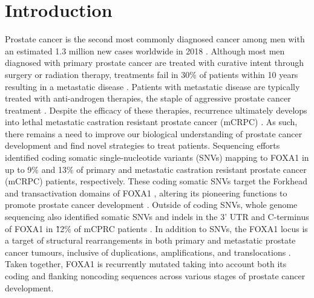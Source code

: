 \section{Introduction}

Prostate cancer is the second most commonly diagnosed cancer among men with an estimated 1.3 million new cases worldwide in 2018 \cite{brayGlobalCancerStatistics2018}.
Although most men diagnosed with primary prostate cancer are treated with curative intent through surgery or radiation therapy, treatments fail in 30\% of patients within 10 years \cite{boorjianLongTermOutcomeRadical2007} resulting in a metastatic disease \cite{litwinDiagnosisTreatmentProstate2017}.
Patients with metastatic disease are typically treated with anti-androgen therapies, the staple of aggressive prostate cancer treatment \cite{attardProstateCancer2016}.
Despite the efficacy of these therapies, recurrence ultimately develops into lethal metastatic castration resistant prostate cancer (mCRPC) \cite{attardProstateCancer2016}.
As such, there remains a need to improve our biological understanding of prostate cancer development and find novel strategies to treat patients.
Sequencing efforts identified coding somatic single-nucleotide variants (SNVs) mapping to FOXA1 in up to 9\% \cite{abeshouseMolecularTaxonomyPrimary2015,fraserGenomicHallmarksLocalized2017,barbieriExomeSequencingIdentifies2012, grassoMutationalLandscapeLethal2012,paroliaDistinctStructuralClasses2019,adamsFOXA1MutationsAlter2019} and 13\% \cite{paroliaDistinctStructuralClasses2019,adamsFOXA1MutationsAlter2019,robinsonIntegrativeClinicalGenomics2015} of primary and metastatic castration resistant prostate cancer (mCRPC) patients, respectively.
These coding somatic SNVs target the Forkhead and transactivation domains of FOXA1 \cite{robinsonFOXA1MutationsHormonedependent2013}, altering its pioneering functions to promote prostate cancer development \cite{adamsFOXA1MutationsAlter2019,gaoForkheadDomainMutations2019}.
Outside of coding SNVs, whole genome sequencing also identified somatic SNVs and indels in the 3' UTR and C-terminus of FOXA1 in \~12\% of mCPRC patients \cite{annalaFrequentMutationFOXA12018}.
In addition to SNVs, the FOXA1 locus is a target of structural rearrangements in both primary and metastatic prostate cancer tumours, inclusive of duplications, amplifications, and translocations \cite{paroliaDistinctStructuralClasses2019,adamsFOXA1MutationsAlter2019}.
Taken together, FOXA1 is recurrently mutated taking into account both its coding and flanking noncoding sequences across various stages of prostate cancer development.


